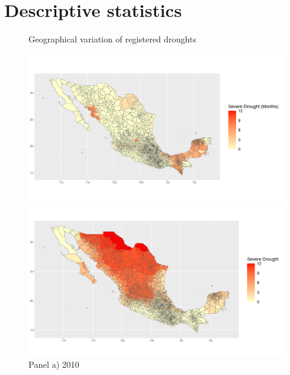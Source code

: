 \documentclass[12pt, oneside]{article}      %
\begin{document}
\section{Descriptive statistics}

\begin{figure}[!ht]
    \centering
    \caption{Geographical variation of registered droughts}
    \begin{minipage}[b]{0.55\textwidth}
        \centering
        \includegraphics[width=\linewidth]{figures/drought_2010.png} %
        \caption*{Panel a) 2010}
    \end{minipage}
    \hfill %
    \begin{minipage}[b]{0.55\textwidth}
        \centering
        \includegraphics[width=\linewidth]{figures/drought_2011.png} %

\end{minipage}
\end{figure}
\end{document}
